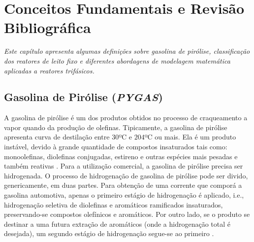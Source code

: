 %
% 
%
\chapter{Conceitos Fundamentais e Revisão Bibliográfica}
\label{chap:revisaobibliografica}

\emph{Este capítulo apresenta algumas definições sobre gasolina de pirólise,
classificação dos reatores de leito fixo e diferentes abordagens de
modelagem matemática aplicadas a reatores trifásicos.}
\section{Gasolina de Pirólise (\emph{PYGAS})} \label{sec:pygas}
A gasolina de pirólise é um dos produtos obtidos no processo de craqueamento a
vapor quando da produção de olefinas. Tipicamente, a gasolina de pirólise
apresenta curva de destilação entre $30$\si{ºC} e $204$\si{ºC} ou mais.
Ela é um produto instável, devido à grande quantidade de compostos
insaturados tais como: monoolefinas, diolefinas conjugadas, estireno e outras
espécies mais pesadas e também reativas \cite{Cheng1986}.
Para a utilização comercial, a gasolina de pirólise precisa ser hidrogenada. O
processo de hidrogenação de gasolina de pirólise pode ser divido, genericamente,
em duas partes. Para obtenção de uma corrente que comporá a gasolina automotiva,
apenas o primeiro estágio de hidrogenação é aplicado, i.e., hidrogenação
seletiva de diolefinas e aromáticos ramificados insaturados, preservando-se
compostos olefínicos e aromáticos. Por outro lado, se o produto se destinar a
uma futura extração de aromáticos (onde a hidrogenação total é desejada), um
segundo estágio de hidrogenação segue-se ao primeiro \cite{Authayanun2008}.
